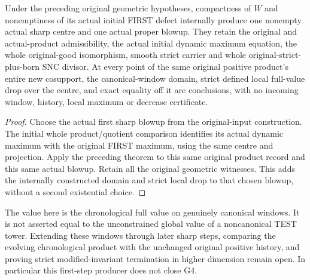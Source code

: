 \begin{theorem}
\label{hir:sharp-actual-original-first-blowup-local-full-drop}
\leanok
Under the preceding original geometric hypotheses, compactness of $W$
and nonemptiness of its actual initial FIRST defect internally produce
one nonempty actual sharp centre and one actual proper blowup. They retain
the original and actual-product admissibility, the actual initial dynamic
maximum equation, the whole original-good isomorphism, smooth strict
carrier and whole original-strict-plus-born SNC divisor. At every point
of the same original positive product's entire new cosupport,
the canonical-window domain, strict defined local full-value drop over
the centre, and exact equality off it are conclusions, with no incoming
window, history, local maximum or decrease certificate.
\end{theorem}
\begin{proof}
Choose the actual first sharp blowup from the original-input construction.
The initial whole product/quotient comparison identifies its actual
dynamic maximum with the original FIRST maximum, using the same centre
and projection. Apply the preceding theorem to this same original product
record and this same actual blowup. Retain all the original geometric
witnesses. This adds the internally constructed domain and strict local
drop to that chosen blowup, without a second existential choice.
\end{proof}

The value here is the chronological full value on genuinely canonical
windows. It is not asserted equal to the unconstrained global value of a
noncanonical TEST tower. Extending these windows through later sharp
steps, comparing the evolving chronological product with the unchanged
original positive history, and proving strict modified-invariant
termination in higher dimension remain open. In particular this first-step
producer does not close G4.
